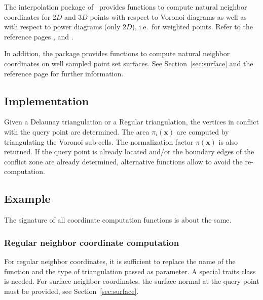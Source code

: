   The interpolation package of \cgal\ provides functions to compute
  natural neighbor coordinates for $2D$ and $3D$ points with respect
  to Voronoi diagrams as well as with respect to power diagrams (only
  $2D$), i.e.\ for weighted points. Refer to the reference pages
  ,
   and
  .
  
  In addition, the package provides functions to compute natural
  neighbor coordinates on well sampled point set surfaces. See
  Section~\ref{sec:surface} and the reference page
   for further information.

\subsection{Implementation}
Given a Delaunay triangulation or a Regular triangulation, the
vertices in conflict with the query point are determined. The area
$\pi_i(\mathbf{x})$ are computed by triangulating the Voronoi
sub-cells.  The normalization factor $\pi(\mathbf{x})$ is also
returned. If the query point is already located and/or the boundary
edges of the conflict zone are already determined, alternative
functions allow to avoid the re-computation.

\subsection{Example}
The signature of all coordinate computation functions is about the
same.
\subsubsection{Regular neighbor coordinate computation}
For regular neighbor coordinates, it is sufficient to replace the name
of the function and the type of triangulation passed as parameter. A
special traits class is needed.
For surface neighbor coordinates, the surface normal at the query
point must be provided, see Section~\ref{sec:surface}.
%
